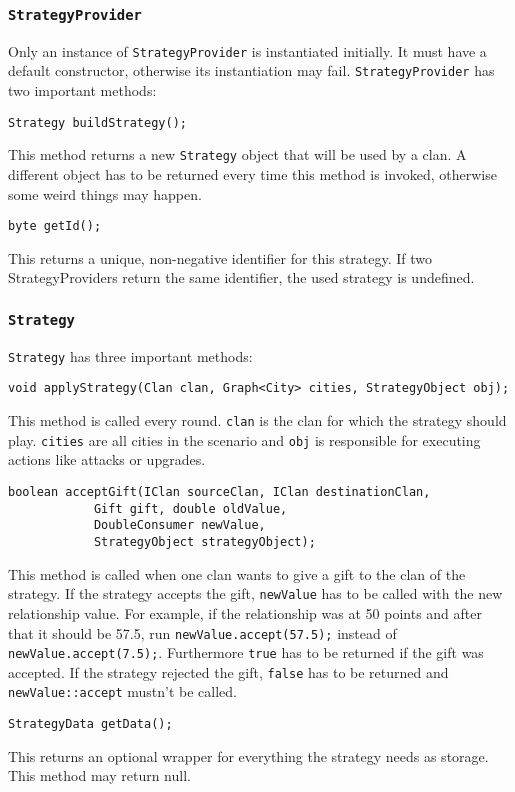 \documentclass{article}
\begin{document}
\subsubsection{\texttt{StrategyProvider}}
Only an instance of \texttt{StrategyProvider} is instantiated initially. It must have a default constructor, otherwise its instantiation may fail. \texttt{StrategyProvider} has two important methods:
\begin{verbatim}
Strategy buildStrategy();
\end{verbatim}
This method returns a new \texttt{Strategy} object that will be used by a clan. A different object has to be returned every time this method is invoked, otherwise some weird things may happen.
\begin{verbatim}
byte getId();
\end{verbatim}
This returns a unique, non-negative identifier for this strategy. If two StrategyProviders return the same identifier, the used strategy is undefined.
\subsubsection{\texttt{Strategy}}
\texttt{Strategy} has three important methods:
\begin{verbatim}
void applyStrategy(Clan clan, Graph<City> cities, StrategyObject obj);
\end{verbatim}
This method is called every round. \texttt{clan} is the clan for which the strategy should play. \texttt{cities} are all cities in the scenario and  \texttt{obj} is responsible for executing
actions like attacks or upgrades.
\begin{verbatim}
boolean acceptGift(IClan sourceClan, IClan destinationClan,
			Gift gift, double oldValue,
			DoubleConsumer newValue,
			StrategyObject strategyObject);
\end{verbatim}
This method is called when one clan wants to give a gift to the clan of the strategy. If the strategy accepts the gift, \texttt{newValue} has to be called with the new relationship value. For example, if the relationship
was at 50 points and after that it should be 57.5, run \texttt{newValue.accept(57.5);} instead of \texttt{newValue.accept(7.5);}. Furthermore \texttt{true} has to be returned if the gift was accepted.
If the strategy rejected the gift, \texttt{false} has to be returned and \texttt{newValue::accept} mustn't be called.

\begin{verbatim}
StrategyData getData();
\end{verbatim}
This returns an optional wrapper for everything the strategy needs as storage. This method may return null.
\end{document}
